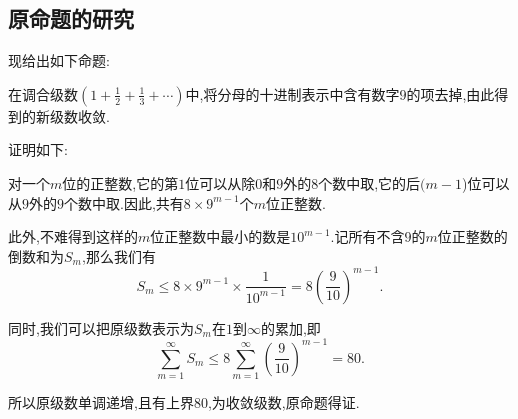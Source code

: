 \documentclass[a4paper,12pt]{article}
\begin{document}
\begin{CJK*}{UTF8}{gbsn}
\subsection{原命题的研究}
\noindent 现给出如下命题:\par\vspace{5pt}
在调合级数$\displaystyle(1+\frac{1}{2}+\frac{1}{3}+\cdots)$中,将分母的十进制表示中含有数字$9$的项去掉,由此得到的新级数收敛.\par\vspace{10pt}
\noindent 证明如下:\par\vspace{5pt}
对一个$m$位的正整数,它的第$1$位可以从除$0$和$9$外的$8$个数中取,它的后$(m-1$)位可以从$9$外的$9$个数中取.因此,共有$8\times9^{m-1}$个$m$位正整数.\par\vspace{5pt}
此外,不难得到这样的$m$位正整数中最小的数是$10^{m-1}$.记所有不含$9$的$m$位正整数的倒数和为$S_m$,那么我们有
\begin{equation*}
S_m\leqslant8\times9^{m-1}\times\frac{1}{10^{m-1}}=8(\frac{9}{10})^{m-1}.
\end{equation*}\par
同时,我们可以把原级数表示为$S_m$在$1$到$\infty$的累加,即
\begin{equation*}
\sum_{m=1}^{\infty}S_m\leqslant8\sum_{m=1}^{\infty}(\frac{9}{10})^{m-1}=80.
\end{equation*}\par
所以原级数单调递增,且有上界$80$,为收敛级数,原命题得证.


\end{CJK*}
\end{document}
